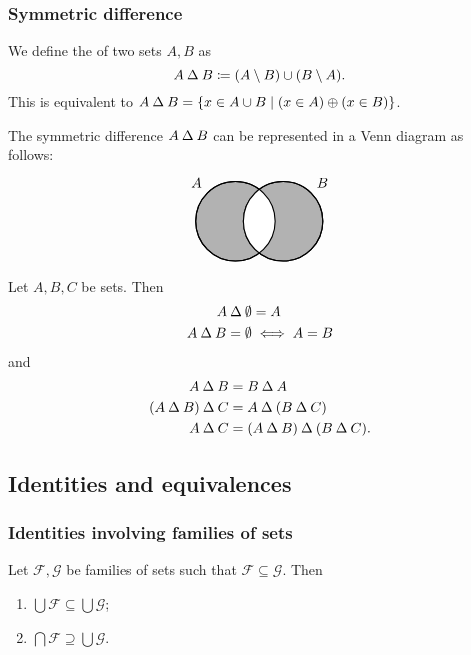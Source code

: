 \subsubsection{Symmetric difference}
\begin{definition}
We define the  of two sets $A,B$ as
\[ A \mathbin{\Delta} B \coloneqq (A\setminus B)\cup(B\setminus A). \]
This is equivalent to $A\symdiff B = \setbuilder{x\in A\cup B}{(x\in A)\oplus (x\in B)}$.
\end{definition}

The symmetric difference $A\mathbin{\Delta} B$ can be represented in a Venn diagram as follows:
\[ \begin{tikzpicture}[thick,
    set/.style = {circle,
        minimum size = 2cm}]

\node[set,draw,fill=black!30,label={135:$A$}] (A) at (0,0) {};

\node[set,draw,fill=black!30,label={45:$B$}] (B) at (1.2,0) {};

\begin{scope}
    \clip (0,0) circle(1cm);
    \clip (1.2,0) circle(1cm);
    \fill[white](0,0) circle(1cm);
\end{scope}

\draw (0,0) circle(1cm);
\draw (1.2,0) circle(1cm);
\end{tikzpicture} \]

\begin{lemma}
Let $A,B,C$ be sets. Then
\begin{align*}
A\mathbin{\Delta} \emptyset &= A \\
A\mathbin{\Delta} B = \emptyset &\iff A = B
\end{align*}
and
\begin{align*}
A \mathbin{\Delta} B &= B \mathbin{\Delta} A \\
(A \mathbin{\Delta} B) \mathbin{\Delta} C &= A \mathbin{\Delta} (B \mathbin{\Delta} C) \\
A \mathbin{\Delta} C &= (A \mathbin{\Delta} B)\mathbin{\Delta}(B \mathbin{\Delta} C).
\end{align*}
\end{lemma}

\subsection{Identities and equivalences}
\subsubsection{Identities involving families of sets}
\begin{lemma}
Let $\mathcal{F}, \mathcal{G}$ be families of sets such that $\mathcal{F}\subseteq \mathcal{G}$. Then
\begin{enumerate}
\item $\bigcup \mathcal{F} \subseteq \bigcup \mathcal{G}$;
\item $\bigcap \mathcal{F} \supseteq \bigcup \mathcal{G}$.
\end{enumerate}
\end{lemma}

